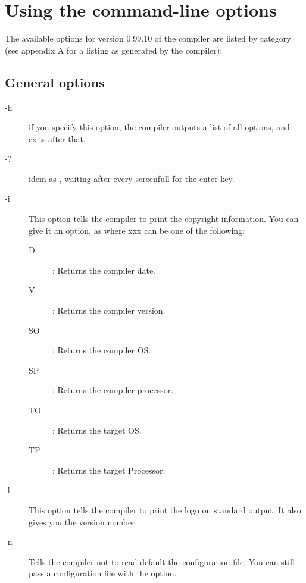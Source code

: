 \documentclass{book}
\begin{document}
\section{Using the command-line options}

The available options for version 0.99.10 of the compiler are listed by
category (see appendix A for a listing as generated by the compiler):

%
%

\subsection{General options}
\begin{description}
\item[-h] if you specify this option, the compiler outputs a list of all options,
and exits after that.
\item[-?] idem as , waiting after every screenfull for the enter key.
\item[-i] This option tells the compiler to print the copyright information.
 You can give it an option, as  where xxx can be one of the
following:
\begin{description}
\item[D] : Returns the compiler date.
\item[V] : Returns the compiler version.
\item[SO] : Returns the compiler OS.
\item[SP] : Returns the compiler processor.
\item[TO] : Returns the target OS.
\item[TP] : Returns the target Processor.
\end{description}
\item[-l] This option tells the compiler to print the \fpc logo on standard
output. It also gives you the \fpc version number.
\item [-n] Tells the compiler not to read default the configuration file.
You can still pass a configuration file with the  option.
\end{description}

%
%
\end{document}
